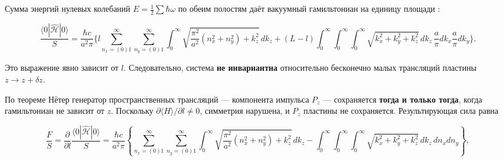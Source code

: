 \documentclass[twoside, 10pt]{article}
\def\myvspacebeforesubsection{-2.0mm}
\def\myvspaceaftersubsection{-2.5mm}
\begin{document}
\begin{multicols}{2}
\vspace{\myvspacebeforesubsection}
\subsection*{}
\vspace{\myvspaceaftersubsection}


Сумма энергий нулевых колебаний \(E=\frac12\sum\hbar\omega\) по обеим полостям даёт вакуумный
гамильтониан на единицу площади \cite{Drozdov2024}:

\end{multicols}

\[
\frac{\langle 0|\hat{\mathcal{H}}|0\rangle}{S} = \frac{\hbar c}{a^2\pi} \Bigg\{
l \sum_{n_x=(0)1}^{\infty}\sum_{n_y=(0)1}^{\infty}
\int_0^{\infty} \sqrt{ \frac{\pi^2}{a^2}(n_x^2 + n_y^2) + k_z^2 } \, dk_z
+ (L - l) \int_0^{\infty}\!\!\int_0^{\infty}
\int_0^{\infty} \sqrt{k_x^2 + k_y^2 + k_z^2} \, dk_z \, \frac{a}{\pi}dk_x \frac{a}{\pi}dk_y
\Bigg\}.
\]

\begin{multicols}{2}

Это выражение явно зависит от \(l\). Следовательно, система \textbf{не инвариантна} относительно
бесконечно малых трансляций пластины \(z\to z+\delta z\).

По теореме Нётер генератор пространственных трансляций --- компонента импульса \(P_z\) ---
сохраняется \textbf{тогда и только тогда}, когда гамильтониан не зависит от \(z\). Поскольку
\(\partial\langle H\rangle/\partial l\neq0\), симметрия нарушена, и \(P_z\) пластины не сохраняется.
Результирующая сила равна

\end{multicols}

\[
\frac{F}{S} = \frac{\partial}{\partial l} \frac{\langle 0|\hat{\mathcal{H}}|0\rangle}{S}
= \frac{\hbar c}{a^2\pi} \left\{
\sum_{n_x=(0)1}^{\infty}\sum_{n_y=(0)1}^{\infty}
\int_0^{\infty} \sqrt{ \frac{\pi^2}{a^2}(n_x^2 + n_y^2) + k_z^2 } \, dk_z
- \int_0^{\infty}\!\!\int_0^{\infty}
\int_0^{\infty} \sqrt{k_x^2 + k_y^2 + k_z^2} \, dk_z \, dn_x dn_y
\right\},
\]
\end{document}
